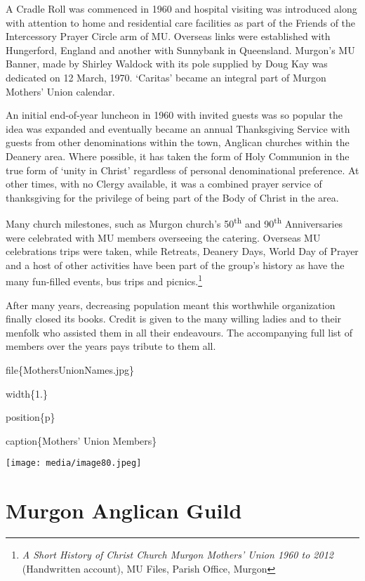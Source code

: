 A Cradle Roll was commenced in 1960 and hospital visiting was introduced along with attention to home and residential care facilities as part of the Friends of the Intercessory Prayer Circle arm of MU. Overseas links were established with Hungerford, England and another with Sunnybank in Queensland. Murgon's MU Banner, made by Shirley Waldock with its pole supplied by Doug Kay was dedicated on 12 March, 1970. `Caritas' became an integral part of Murgon Mothers' Union calendar.

An initial end-of-year luncheon in 1960 with invited guests was so popular the idea was expanded and eventually became an annual Thanksgiving Service with guests from other denominations within the town, Anglican churches within the Deanery area. Where possible, it has taken the form of Holy Communion in the true form of `unity in Christ' regardless of personal denominational preference. At other times, with no Clergy available, it was a combined prayer service of thanksgiving for the privilege of being part of the Body of Christ in the area.

Many church milestones, such as Murgon church's 50\textsuperscript{th} and 90\textsuperscript{th} Anniversaries were celebrated with MU members overseeing the catering. Overseas MU celebrations trips were taken, while Retreats, Deanery Days, World Day of Prayer and a host of other activities have been part of the group's history as have the many fun-filled events, bus trips and picnics.\footnote{\emph{A Short History of Christ Church Murgon Mothers' Union 1960 to 2012} (Handwritten account), MU Files, Parish Office, Murgon}

After many years, decreasing population meant this worthwhile organization finally closed its books. Credit is given to the many willing ladies and to their menfolk who assisted them in all their endeavours. The accompanying full list of members over the years pays tribute to them all.

file\{MothersUnionNames.jpg\}

width\{1.\}

position\{p\}

caption\{Mothers' Union Members\}

\texttt{[image: media/image80.jpeg]}

\hypertarget{murgon-anglican-guild}{%
\section{Murgon Anglican Guild}\label{murgon-anglican-guild}}

